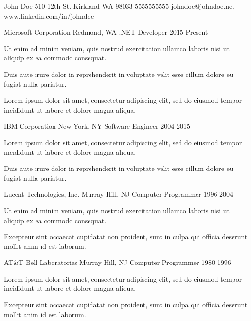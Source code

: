 \documentclass[10pt,letterpaper]{article}
\begin{document}
\contactinfo
  {John Doe}                          %
  {510 12th St.}                      %
  {Kirkland}                          %
  {WA 98033}                          %
  {5555555555}                        %
  {johndoe@johndoe.net}               %
  {\url{www.linkedin.com/in/johndoe}} %

\experience
\begin{itemize}

  \job
    {Microsoft Corporation}  %
    {Redmond, WA}            %
    {.NET Developer}         %
    {2015}                   %
    {Present}                %
    {\item Ut enim ad minim veniam, quis nostrud exercitation ullamco
      laboris nisi ut aliquip ex ea commodo consequat.
     \item Duis aute irure dolor in reprehenderit in voluptate velit esse
  cillum dolore eu fugiat nulla pariatur.
     \item Lorem ipsum dolor sit amet, consectetur adipiscing elit, sed do eiusmod
  tempor incididunt ut labore et dolore magna aliqua.}
  
  \job
    {IBM Corporation}
    {New York, NY}
    {Software Engineer}
    {2004}
    {2015}
    {\item Lorem ipsum dolor sit amet, consectetur adipiscing elit, sed do eiusmod
  tempor incididunt ut labore et dolore magna aliqua.
    \item Duis aute irure dolor in reprehenderit in voluptate velit esse
  cillum dolore eu fugiat nulla pariatur.}

  \job
    {Lucent Technologies, Inc.}
    {Murray Hill, NJ}
    {Computer Programmer}
    {1996}
    {2004}
    {\item Ut enim ad minim veniam,
  quis nostrud exercitation ullamco laboris nisi ut aliquip ex ea commodo
  consequat.
    \item Excepteur sint occaecat cupidatat
  non proident, sunt in culpa qui officia deserunt mollit anim id est laborum.}

  \job
    {AT\&T Bell Laboratories}
    {Murray Hill, NJ}
    {Computer Programmer}
    {1980}
    {1996}
    {\item Lorem ipsum dolor sit amet, consectetur adipiscing elit, sed do eiusmod
     tempor incididunt ut labore et dolore magna aliqua.
    \item Excepteur sint occaecat cupidatat
  non proident, sunt in culpa qui officia deserunt mollit anim id est laborum.}
    
\end{itemize}
\end{document}

